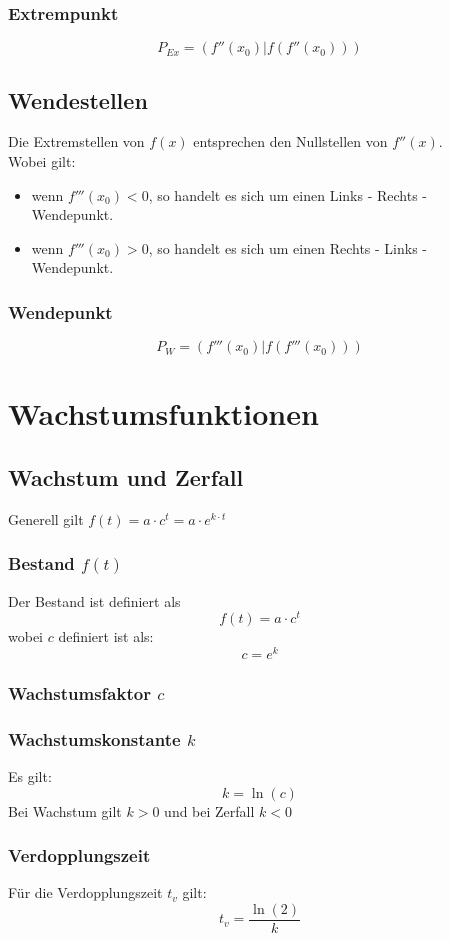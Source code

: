 \documentclass[a4paper,12pt]{article}
\begin{document}
\subsubsection{Extrempunkt}
$$P_{Ex} = (f''(x_0) | f(f''(x_0)))$$
\subsection{Wendestellen}
Die Extremstellen von $f(x)$ entsprechen den Nullstellen von $f''(x)$.\\
Wobei gilt:
\begin{itemize}
\item wenn $f'''(x_0) < 0$, so handelt es sich um einen Links - Rechts - Wendepunkt.
\item wenn $f'''(x_0) > 0$, so handelt es sich um einen Rechts - Links - Wendepunkt.
\end{itemize}
\subsubsection{Wendepunkt}
$$P_{W} = (f'''(x_0) | f(f'''(x_0)))$$
\section{Wachstumsfunktionen}


\subsection{Wachstum und Zerfall}
Generell gilt $f(t) = a \cdot c^t = a \cdot e^{k \cdot t}$ 
\subsubsection{Bestand $f(t)$}
Der Bestand ist definiert als
$$f(t) = a \cdot c^t$$
wobei $c$ definiert ist als:
$$c = e^k$$
\subsubsection{Wachstumsfaktor $c$}
\subsubsection{Wachstumskonstante $k$}
Es gilt:
$$k = \ln{(c)}$$
Bei Wachstum gilt $k > 0$ und bei Zerfall $k < 0$
\subsubsection{Verdopplungszeit}
Für die Verdopplungszeit $t_v$ gilt:
$$t_v = \frac{\ln{(2)}}{k}$$
\end{document}
